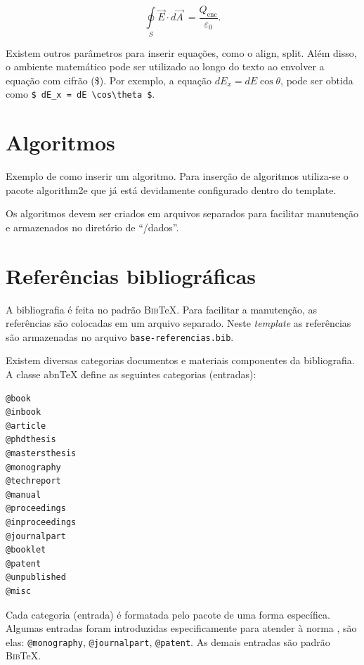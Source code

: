 \begin{equation*}
    \oint \limits_S \Vec{E}\cdot d \Vec{A}\ =
    \frac{Q_{\mathrm{enc}}}{\varepsilon_0}
    .
\end{equation*}

Existem outros parâmetros para inserir equações, como o {\ttfamily align},  {\ttfamily split}.
Além disso, o ambiente matemático pode ser utilizado ao longo do texto ao envolver a equação com cifrão (\$). Por exemplo, a equação $ dE_x = dE \cos\theta $, pode ser obtida como
\verb|$ dE_x = dE \cos\theta $|.


\section{Algoritmos}
\label{sec:algoritmos}

Exemplo de como inserir um algoritmo. Para inserção de algoritmos utiliza-se o pacote {\ttfamily algorithm2e} que já está devidamente configurado dentro do template.

Os algoritmos devem ser criados em arquivos separados para facilitar manutenção e armazenados no diretório de ``/dados''. \\



\section{Referências bibliográficas}
\label{sec:referenciasBibliograficas}

A bibliografia é feita no padrão \textsc{Bib}\TeX{}. Para facilitar a manutenção, as referências são colocadas em um arquivo separado. Neste \textit{template} as referências são armazenadas no arquivo \verb|base-referencias.bib|.

Existem diversas categorias documentos e materiais componentes da bibliografia. A classe abn\TeX{} define as seguintes categorias (entradas):

\begin{verbatim}
@book
@inbook
@article
@phdthesis
@mastersthesis
@monography
@techreport
@manual
@proceedings
@inproceedings
@journalpart
@booklet
@patent
@unpublished
@misc
\end{verbatim}

Cada categoria (entrada) é formatada pelo pacote  de uma forma específica. Algumas entradas foram introduzidas especificamente para atender à norma , são elas: \verb|@monography|, \verb|@journalpart|, \verb|@patent|. As demais entradas são padrão \textsc{Bib}\TeX{}.

